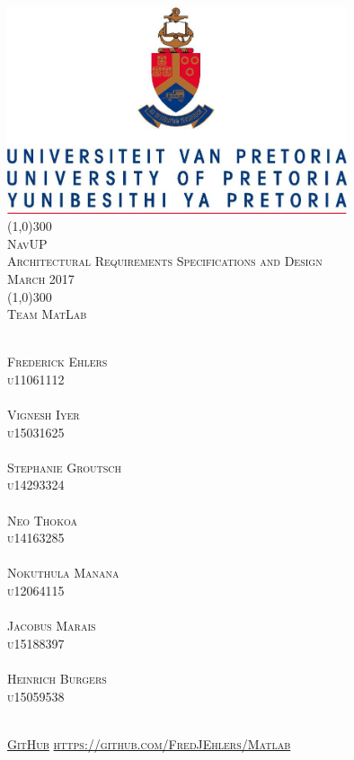 \documentclass[runningheads,a4paper]{article}
\begin{document}
\begin{titlepage}
\begin{center}
\includegraphics[width=10cm]{Images/Logo/UP.jpg}  \\
[1cm]
\line(1,0){300} \\
[0.3cm]
\textsc{\Large
NavUP \\
Architectural Requirements Specifications and Design \\
\hfill {} March 2017
}\\
[0.1cm]
\line(1,0){300} \\
[0.7cm]
\textsc{\Large
Team MatLab
} \\
\end{center}
\begin{center}
\begin{multicols}{2}
\textsc{\large\\
Frederick Ehlers\\ 
u11061112\\ 
}
\textsc{\large\\
Vignesh Iyer\\
u15031625\\ 
}
\textsc{\large\\
Stephanie Groutsch\\
u14293324\\ 
}
\textsc{\large\\
Neo Thokoa\\
u14163285\\
}
\columnbreak
\textsc{\large\\
Nokuthula Manana\\
u12064115\\
}
\textsc{\large\\
Jacobus Marais\\
u15188397\\
}
\textsc{\large\\
Heinrich Burgers\\
u15059538\\
}
\end{multicols}
\textsc{	\\ \href{https://github.com/FredJEhlers/Matlab}{GitHub}
\url{https://github.com/FredJEhlers/Matlab}}
\end{center}
\end{titlepage}
\end{document}
